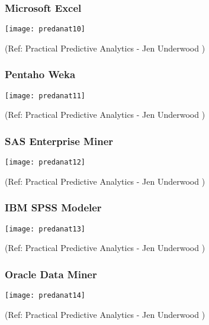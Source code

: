 \begin{frame}\frametitle{Microsoft Excel}

\begin{center}
\texttt{[image: predanat10]}
\end{center}

{\tiny (Ref: Practical Predictive Analytics - Jen Underwood )}


\end{frame}

\begin{frame}\frametitle{Pentaho Weka}

\begin{center}
\texttt{[image: predanat11]}
\end{center}

{\tiny (Ref: Practical Predictive Analytics - Jen Underwood )}


\end{frame}

\begin{frame}\frametitle{SAS Enterprise Miner}

\begin{center}
\texttt{[image: predanat12]}
\end{center}

{\tiny (Ref: Practical Predictive Analytics - Jen Underwood )}


\end{frame}

\begin{frame}\frametitle{IBM SPSS Modeler}

\begin{center}
\texttt{[image: predanat13]}
\end{center}

{\tiny (Ref: Practical Predictive Analytics - Jen Underwood )}


\end{frame}

\begin{frame}\frametitle{Oracle Data Miner}

\begin{center}
\texttt{[image: predanat14]}
\end{center}

{\tiny (Ref: Practical Predictive Analytics - Jen Underwood )}


\end{frame}

